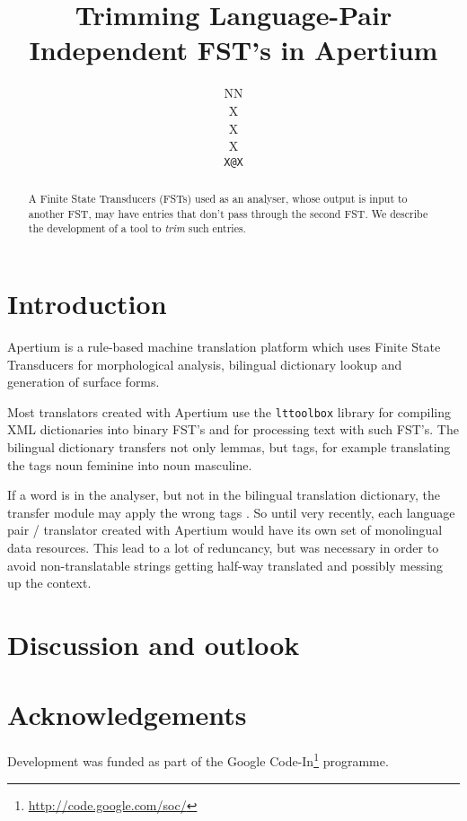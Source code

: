 \documentclass[11pt]{article}
\author{NN\\  X \\ X \\  X \\  {\tt \small   X@X}}
\title{Trimming Language-Pair Independent FST's in Apertium}
\begin{document}
\maketitle

\begin{abstract}
  A Finite State Transducers (FSTs) used as an analyser, whose output
  is input to another FST, may have entries that don't pass through
  the second FST. We describe the development of a tool to \emph{trim}
  such entries.
\end{abstract}

\section{Introduction}
Apertium is a rule-based machine translation platform which uses
Finite State Transducers for morphological analysis, bilingual
dictionary lookup and generation of surface forms.

Most translators created with Apertium use the \texttt{lttoolbox}
library for compiling XML dictionaries into binary FST's and for
processing text with such FST's. The bilingual dictionary transfers
not only lemmas, but tags, for example translating the tags noun
feminine into noun masculine.

If a word is in the analyser, but not in the bilingual translation
dictionary, the transfer module may apply the wrong tags . So until
very recently, each language pair / translator created with Apertium
would have its own set of monolingual data resources. This lead to a
lot of reduncancy, but was necessary in order to avoid
non-translatable strings getting half-way translated and possibly
messing up the context.


\section{Discussion and outlook}
\section*{Acknowledgements}
Development was funded as part of the Google
Code-In\footnote{\href{http://code.google.com/soc/}{http://code.google.com/soc/}
} programme.




\end{document}
